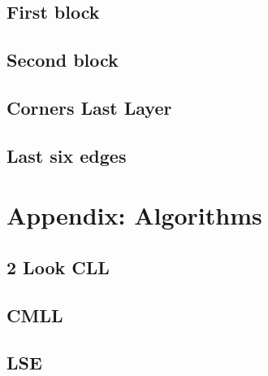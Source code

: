 \documentclass{scrreprt}
\begin{document}
\section{First block}

\section{Second block}

\section{Corners Last Layer}

\section{Last six edges}

\chapter{Appendix: Algorithms}

\section{2 Look CLL}

\section{CMLL}

\section{LSE}
\end{document}
